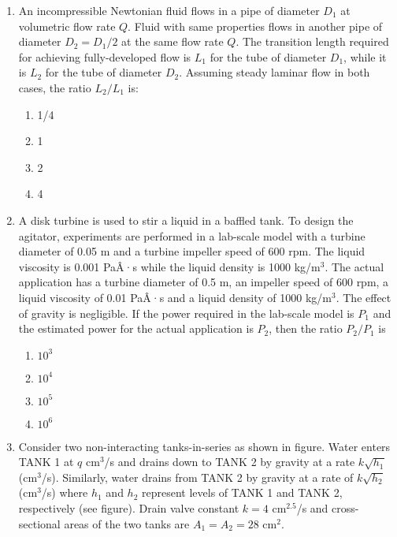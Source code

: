 \documentclass[12pt]{article}
\begin{document}
\begin{enumerate}[label=Q.\arabic*]
		\item An incompressible Newtonian fluid flows in a pipe of diameter $D_1$ at volumetric flow rate $Q$. Fluid with same properties flows in another pipe of diameter $D_2 = D_1/2$ at the same flow rate $Q$. The transition length required for achieving fully-developed flow is $L_1$ for the tube of diameter $D_1$, while it is $L_2$ for the tube of diameter $D_2$. Assuming steady laminar flow in both cases, the ratio $L_2/L_1$ is:
			\begin{multicols}{2}
				\begin{enumerate}[label=(\Alph*)]
					\item 1/4
					\item 1
					\item 2
					\item 4
				\end{enumerate}
			\end{multicols}

		\item A disk turbine is used to stir a liquid in a baffled tank. To design the agitator, experiments are performed in a lab-scale model with a turbine diameter of 0.05 m and a turbine impeller speed of 600 rpm. The liquid viscosity is 0.001 PaÂ·s while the liquid density is 1000 kg/m$^3$. The actual application has a turbine diameter of 0.5 m, an impeller speed of 600 rpm, a liquid viscosity of 0.01 PaÂ·s and a liquid density of 1000 kg/m$^3$. The effect of gravity is negligible. If the power required in the lab-scale model is $P_1$ and the estimated power for the actual application is $P_2$, then the ratio $P_2 / P_1$ is
			\begin{multicols}{2}
				\begin{enumerate}[label=(\Alph*)]
					\item $10^3$
					\item $10^4$
					\item $10^5$
					\item $10^6$
				\end{enumerate}
			\end{multicols}

		\item Consider two non-interacting tanks-in-series as shown in figure. Water enters TANK 1 at $q$ cm$^3$/s and drains down to TANK 2 by gravity at a rate $k \sqrt{h_1}$ (cm$^3$/s). Similarly, water drains from TANK 2 by gravity at a rate of $k \sqrt{h_2}$ (cm$^3$/s) where $h_1$ and $h_2$ represent levels of TANK 1 and TANK 2, respectively (see figure). Drain valve constant $k = 4$ cm$^{2.5}$/s and cross-sectional areas of the two tanks are $A_1 = A_2 = 28$ cm$^2$.


\end{enumerate}
\end{document}
